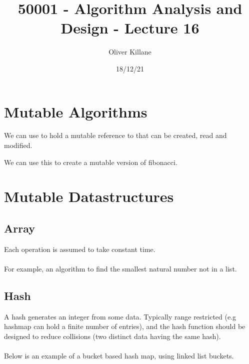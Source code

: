 \documentclass{report}
\title{50001 - Algorithm Analysis and Design - Lecture 16}
\author{Oliver Killane}
\date{18/12/21}
\begin{document}
    \maketitle

    \section*{Mutable Algorithms}
        We can use    to hold a mutable reference to 
         that can be created, read and modified.

        We can use this to create a mutable version of fibonacci.

    \section*{Mutable Datastructures}
        \subsection*{Array}
            Each operation is assumed to take constant time. 
            \\
            \\ For example, an algorithm to find the smallest natural number not in a list.

        \subsection*{Hash}
            A hash generates an integer from some data. Typically range restricted 
            (e.g hashmap can hold a finite number of entries), and the hash function 
            should be designed to reduce collisions (two distinct data having the same hash).
            \\
            \\ Below is an example of a bucket based hash map, using linked list buckets.
\end{document}
